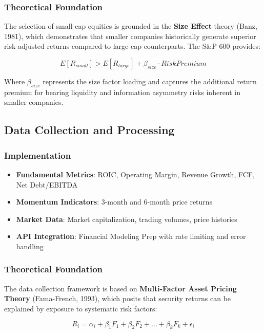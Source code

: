 \documentclass[12pt,a4paper]{article}
\begin{document}
\subsubsection{Theoretical Foundation}
The selection of small-cap equities is grounded in the \textbf{Size Effect} theory (Banz, 1981), which demonstrates that smaller companies historically generate superior risk-adjusted returns compared to large-cap counterparts. The S\&P 600 provides:

\begin{equation}
E[R_{small}] > E[R_{large}] + \beta_{size} \cdot Risk Premium
\end{equation}

Where $\beta_{size}$ represents the size factor loading and captures the additional return premium for bearing liquidity and information asymmetry risks inherent in smaller companies.

\subsection{Data Collection and Processing}

\subsubsection{Implementation}
\begin{itemize}
    \item \textbf{Fundamental Metrics}: ROIC, Operating Margin, Revenue Growth, FCF, Net Debt/EBITDA
    \item \textbf{Momentum Indicators}: 3-month and 6-month price returns
    \item \textbf{Market Data}: Market capitalization, trading volumes, price histories
    \item \textbf{API Integration}: Financial Modeling Prep with rate limiting and error handling
\end{itemize}

\subsubsection{Theoretical Foundation}
The data collection framework is based on \textbf{Multi-Factor Asset Pricing Theory} (Fama-French, 1993), which posits that security returns can be explained by exposure to systematic risk factors:

\begin{equation}
R_i = \alpha_i + \beta_1 F_1 + \beta_2 F_2 + \ldots + \beta_k F_k + \epsilon_i
\end{equation}
\end{document}
